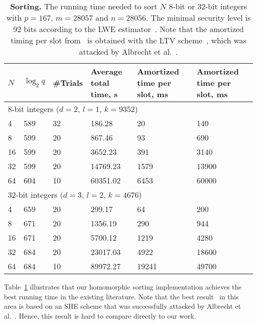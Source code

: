 \begin{table}[h]
  \centering
  \begin{tabular*}{.45\textwidth}{ p{0.3cm} p{0.7cm} p{0.8cm} p{1cm} p{1.3cm} p{1.5cm}}
    \toprule
    $N$     & $\log_2 q$    & \#Trials  & Average total time, s & Amortized time per slot, ms & Amortized time per slot, ms~\cite{CDSS15} \\
    \midrule
    \multicolumn{6}{l}{8-bit integers ($d=2$, $l=1$, $k=9352$)} \\
    \cmidrule(lr){1-6}
    4       & 589     & 32        & 186.28       & 20    & 140 \\
    8       & 599     & 20        & 867.46       & 93    & 690 \\
    16      & 599     & 20        & 3652.23      & 391   & 3140\\
    32      & 599     & 20        & 14769.23     & 1579  & 13900 \\
    64      & 604     & 10        & 60351.02     & 6453  & 60000 \\
    \midrule
    \multicolumn{6}{l}{32-bit integers ($d=3$, $l=2$, $k=4676$)} \\
    \cmidrule(lr){1-6}
    4       & 659     & 20        & 299.17       & 64    & 200 \\
    8       & 671     & 20        & 1356.19      & 290   & 944 \\
    16      & 671     & 20        & 5700.12      & 1219  & 4280 \\
    32      & 684     & 20        & 23017.03     & 4922  & 18600 \\
    64      & 684     & 10        & 89972.27     & 19241 & 49700 \\
    \bottomrule
  \end{tabular*}
  \caption{\textbf{Sorting.} The running time needed to sort $N$ 8-bit or 32-bit integers with $p=167$, $m=28057$ and $n=28056$. The minimal security level is 92 bits according to the LWE estimator~\cite{lwe_estimator}. Note that the amortized timing per slot from~\cite{CDSS15} is obtained with the LTV scheme~\cite{STOC:LopTroVai12}, which was attacked by Albrecht et al.~\cite{C:AlbBaiDuc16}.}
  \label{table:sorting_circuit_results}
\end{table}

Table~\ref{table:sorting_circuit_results} illustrates that our homomorphic sorting implementation achieves the best running time in the existing literature.
Note that the best result~\cite{CDSS15} in this area is based on an SHE scheme that was successfully attacked by Albrecht et al.~\cite{C:AlbBaiDuc16}.
Hence, this result is hard to compare directly to our work.


